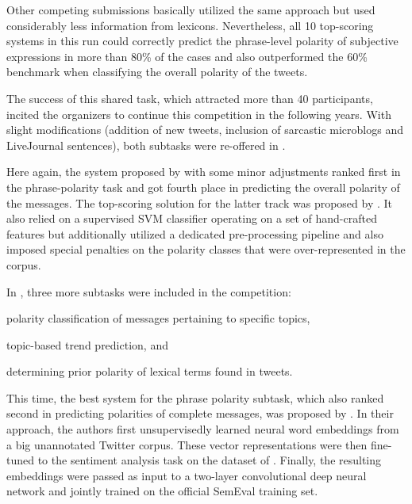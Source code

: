 Other competing submissions \cite{Becker:13,Guenther:13,Kokciyan:13}
basically utilized the same approach but used considerably less
information from lexicons.  Nevertheless, all 10 top-scoring systems
in this run could correctly predict the phrase-level polarity of
subjective expressions in more than 80\% of the cases and also
outperformed the 60\% benchmark when classifying the overall polarity
of the tweets.

The success of this shared task, which attracted more than 40
participants, incited the organizers to continue this competition in
the following years.  With slight modifications (addition of new
tweets, inclusion of sarcastic microblogs and LiveJournal sentences),
both subtasks were re-offered in \citeyear{Rosenthal:14}
\cite[cf.][]{Rosenthal:14}.

Here again, the system proposed by \citet{Mohammad:13} with some minor
adjustments \cite{Zhu:14} ranked first in the phrase-polarity task and
got fourth place in predicting the overall polarity of the messages.
The top-scoring solution for the latter track was proposed by
\citet{Miura:14}.  It also relied on a supervised SVM classifier
operating on a set of hand-crafted features but additionally utilized
a dedicated pre-processing pipeline and also imposed special penalties
on the polarity classes that were over-represented in the corpus.

In \citeyear{Rosenthal:15}, three more subtasks were included in the
competition:
\begin{inparaenum}
  \item polarity classification of messages pertaining to specific
    topics,
  \item topic-based trend prediction, and
  \item determining prior polarity of lexical terms found in tweets.
\end{inparaenum}

This time, the best system for the phrase polarity subtask, which also
ranked second in predicting polarities of complete messages, was
proposed by \citet{Severyn:15}.  In their approach, the authors first
unsupervisedly learned neural word embeddings from a big unannotated
Twitter corpus.  These vector representations were then fine-tuned to
the sentiment analysis task on the dataset of \citet{Go:09}.  Finally,
the resulting embeddings were passed as input to a two-layer
convolutional deep neural network and jointly trained on the official
SemEval training set.

